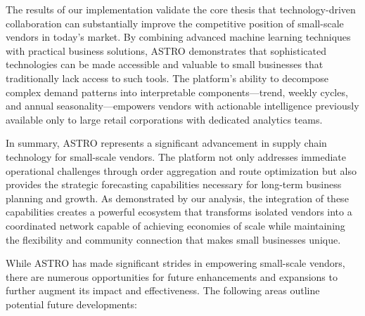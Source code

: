 \par The results of our implementation validate the core thesis that technology-driven collaboration can substantially improve the competitive position of small-scale vendors in today's market. By combining advanced machine learning techniques with practical business solutions, ASTRO demonstrates that sophisticated technologies can be made accessible and valuable to small businesses that traditionally lack access to such tools. The platform's ability to decompose complex demand patterns into interpretable components—trend, weekly cycles, and annual seasonality—empowers vendors with actionable intelligence previously available only to large retail corporations with dedicated analytics teams.

\par In summary, ASTRO represents a significant advancement in supply chain technology for small-scale vendors. The platform not only addresses immediate operational challenges through order aggregation and route optimization but also provides the strategic forecasting capabilities necessary for long-term business planning and growth. As demonstrated by our analysis, the integration of these capabilities creates a powerful ecosystem that transforms isolated vendors into a coordinated network capable of achieving economies of scale while maintaining the flexibility and community connection that makes small businesses unique.

While ASTRO has made significant strides in empowering small-scale vendors, there are numerous opportunities for future enhancements and expansions to further augment its impact and effectiveness. The following areas outline potential future developments:

